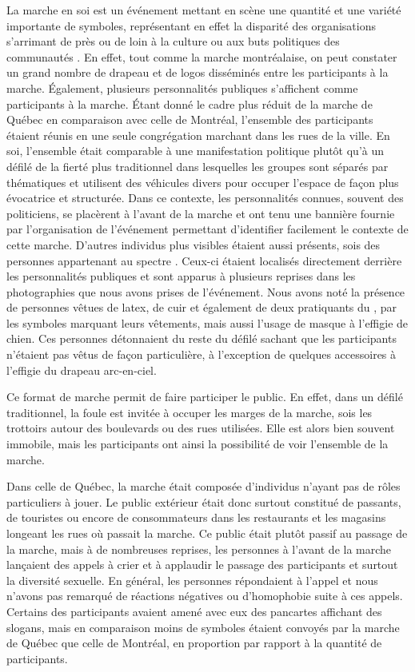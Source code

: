 La marche en soi est un événement mettant en scène une quantité et une variété importante de symboles, représentant en effet la disparité des organisations s'arrimant de près ou de loin à la culture ou aux buts politiques des communautés \lgbt.
En effet, tout comme la marche montréalaise, on peut constater un grand nombre de drapeau et de logos disséminés entre les participants à la marche.
Également, plusieurs personnalités publiques s'affichent comme participants à la marche.
Étant donné le cadre plus réduit de la marche de Québec en comparaison avec celle de Montréal, l'ensemble des participants étaient réunis en une seule congrégation marchant dans les rues de la ville.
En soi, l'ensemble était comparable à une manifestation politique plutôt qu'à un défilé de la fierté plus traditionnel dans lesquelles les groupes sont séparés par thématiques et utilisent des véhicules divers pour occuper l'espace de façon plus évocatrice et structurée.
Dans ce contexte, les personnalités connues, souvent des politiciens, se placèrent à l'avant de la marche et ont tenu une bannière fournie par l'organisation de l'événement permettant d'identifier facilement le contexte de cette marche.
D'autres individus plus visibles étaient aussi présents, sois des personnes appartenant au spectre \bdsm{}.
Ceux-ci étaient localisés directement derrière les personnalités publiques et sont apparus à plusieurs reprises dans les photographies que nous avons prises de l'événement.
Nous avons noté la présence de personnes vêtues de latex, de cuir et également de deux pratiquants du , par les symboles marquant leurs vêtements, mais aussi l'usage de masque à l'effigie de chien.
Ces personnes détonnaient du reste du défilé sachant que les participants n'étaient pas vêtus de façon particulière, à l'exception de quelques accessoires à l'effigie du drapeau arc-en-ciel.

Ce format de marche permit de faire participer le public.
En effet, dans un défilé traditionnel, la foule est invitée à occuper les marges de la marche, sois les trottoirs autour des boulevards ou des rues utilisées.
Elle est alors bien souvent immobile, mais les participants ont ainsi la possibilité de voir l'ensemble de la marche.

Dans celle de Québec, la marche était composée d'individus n'ayant pas de rôles particuliers à jouer.
Le public extérieur était donc surtout constitué de passants, de touristes ou encore de consommateurs dans les restaurants et les magasins longeant les rues où passait la marche.
Ce public était plutôt passif au passage de la marche, mais à de
nombreuses reprises, les personnes à l'avant de la marche lançaient des appels à
crier et à applaudir le passage des participants et surtout la diversité
sexuelle.
En général, les personnes répondaient à l'appel et nous n'avons pas remarqué de
réactions négatives ou d'homophobie suite à ces appels.
Certains des participants avaient amené avec eux des pancartes affichant des slogans, mais en comparaison moins de symboles étaient convoyés par la marche de Québec que celle de Montréal, en proportion par rapport à la quantité de participants. 

